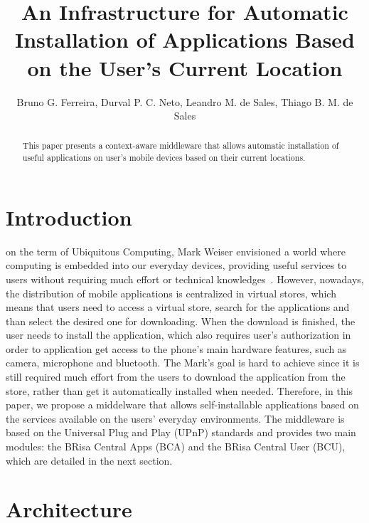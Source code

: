 \documentclass[journal]{IEEEtran}
\begin{document}
\title{An Infrastructure for Automatic Installation of Applications Based on the User's Current Location}

\author{
        Bruno G. Ferreira,
        Durval P. C. Neto,
        Leandro M. de Sales,
        Thiago B. M. de Sales
}

\maketitle

\begin{abstract}
This paper presents a context-aware middleware that allows automatic installation of useful  applications on user's mobile devices based on their current locations.
\end{abstract}

\IEEEpeerreviewmaketitle



\section{Introduction}

 on the term of Ubiquitous Computing, Mark Weiser envisioned a world where computing is embedded into our everyday devices, providing useful services to  users without requiring much effort or technical knowledges~\cite{weiser1991,weiser2001}. However, nowadays, the distribution of mobile applications is centralized in virtual stores, which means that users need to access a virtual store, search for the applications and than select the desired one for downloading. When the download is finished, the user needs to install the application, which also requires user's authorization in order to application get access to the phone's main hardware features, such as camera, microphone and bluetooth. The Mark's goal is hard to achieve since it is still required much effort from the users to download the application from the store, rather than get it automatically installed when needed. Therefore, in this paper, we propose a middelware that allows self-installable applications based on the services available on the users' everyday environments. The middleware is based on the Universal Plug and Play (UPnP) standards and provides two main modules: the BRisa Central Apps (BCA) and the BRisa Central User (BCU), which are detailed in the next section.

\section{Architecture}
\end{document}
